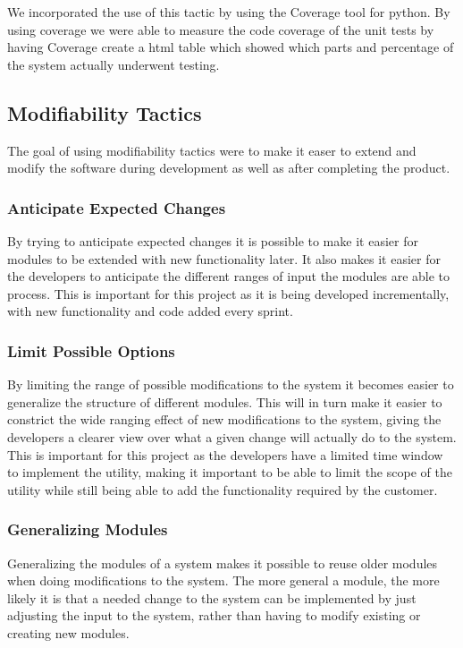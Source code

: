 We incorporated the use of this tactic by using the Coverage tool for python. By using coverage we were able to measure the code coverage of the unit tests by having Coverage create a html table which showed which parts and percentage of the system actually underwent testing.

\subsection{Modifiability Tactics}
The goal of using modifiability tactics were to make it easer to extend and modify the software during development as well as after completing the product.

\subsubsection{Anticipate Expected Changes}
By trying to anticipate expected changes it is possible to make it easier for modules to be extended with new functionality later. It also makes it easier for the developers to anticipate the different ranges of input the modules are able to process. This is important for this project as it is being developed incrementally, with new functionality and code added every sprint.

\subsubsection{Limit Possible Options}
By limiting the range of possible modifications to the system it becomes easier to generalize the structure of different modules. This will in turn make it easier to constrict the wide ranging effect of new modifications to the system, giving the developers a clearer view over what a given change will actually do to the system. This is important for this project as the developers have a limited time window to implement the \gls{utility}, making it important to be able to limit the scope of the \gls{utility} while still being able to add the functionality required by the customer.

\subsubsection{Generalizing Modules}
Generalizing the modules of a system makes it possible to reuse older modules when doing modifications to the system. The more general a module, the more likely it is that a needed change to the system can be implemented by just adjusting the input to the system, rather than having to modify existing or creating new modules.

